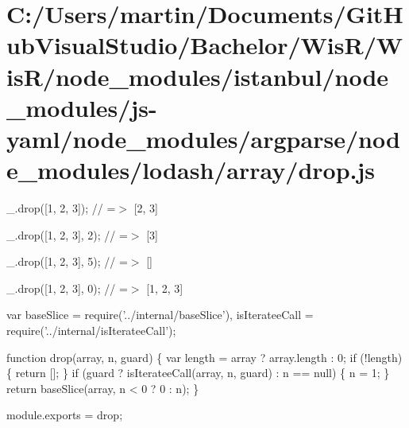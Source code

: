 \hypertarget{_c_1_2_users_2martin_2_documents_2_git_hub_visual_studio_2_bachelor_2_wis_r_2_wis_r_2node_module9aa516c5269202b61ae40adab339cf00}{}\section{C\+:/\+Users/martin/\+Documents/\+Git\+Hub\+Visual\+Studio/\+Bachelor/\+Wis\+R/\+Wis\+R/node\+\_\+modules/istanbul/node\+\_\+modules/js-\/yaml/node\+\_\+modules/argparse/node\+\_\+modules/lodash/array/drop.\+js}
\+\_\+.\+drop(\mbox{[}1, 2, 3\mbox{]}); // =$>$ \mbox{[}2, 3\mbox{]}

\+\_\+.\+drop(\mbox{[}1, 2, 3\mbox{]}, 2); // =$>$ \mbox{[}3\mbox{]}

\+\_\+.\+drop(\mbox{[}1, 2, 3\mbox{]}, 5); // =$>$ \mbox{[}\mbox{]}

\+\_\+.\+drop(\mbox{[}1, 2, 3\mbox{]}, 0); // =$>$ \mbox{[}1, 2, 3\mbox{]}


\begin{DoxyCodeInclude}
var baseSlice = require(\textcolor{stringliteral}{'../internal/baseSlice'}),
    isIterateeCall = require(\textcolor{stringliteral}{'../internal/isIterateeCall'});

\textcolor{keyword}{function} drop(array, n, guard) \{
  var length = array ? array.length : 0;
  \textcolor{keywordflow}{if} (!length) \{
    \textcolor{keywordflow}{return} [];
  \}
  \textcolor{keywordflow}{if} (guard ? isIterateeCall(array, n, guard) : n == null) \{
    n = 1;
  \}
  \textcolor{keywordflow}{return} baseSlice(array, n < 0 ? 0 : n);
\}

module.exports = drop;
\end{DoxyCodeInclude}
 